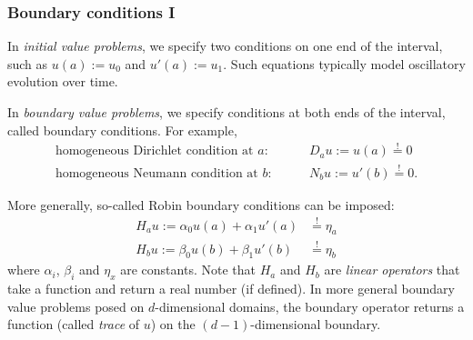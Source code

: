 \documentclass[12pt,a4paper]{article}
\begin{document}
    
    \subsubsection*{Boundary conditions I}
    
    
    In \emph{initial value problems},
    we specify two conditions
    on one end of the interval, 
    such as
    $
        u(a) := u_0
    $
    and
    $
        u'(a) := u_1
    $.
    Such equations typically model oscillatory evolution over time.
    
    
    In \emph{boundary value problems}, 
    we specify conditions at both ends of the interval,
    called boundary conditions.
    For example,
    \begin{align}
        \text{homogeneous Dirichlet condition at $a$}:
        & 
        \qquad
        D_a u := u(a) \stackrel{!}{=} 0
        \\
        \text{homogeneous Neumann condition at $b$}:
        &
        \qquad
        N_b u := u'(b) \stackrel{!}{=} 0
        .
    \end{align}
    
    
    More generally,
    so-called
    Robin boundary conditions can be imposed:
    \begin{subequations}
        \label{e:H}
        \begin{align}
            H_a u := \alpha_0 u(a) + \alpha_1 u'(a) & \stackrel{!}{=} \eta_a
            \\
            H_b u := \beta_0 u(b) + \beta_1 u'(b) & \stackrel{!}{=} \eta_b
        \end{align}
    \end{subequations}
    where 
    $\alpha_i$, $\beta_i$ and $\eta_x$ are constants.
    Note that $H_a$ and $H_b$ are
    \emph{linear operators}
    that take a function 
    and return a real number (if defined).
    In more general boundary value problems
    posed on $d$-dimensional domains,
    the boundary operator
    returns a function (called \emph{trace} of $u$) 
    on the $(d - 1)$-dimensional boundary.
    
\end{document}
